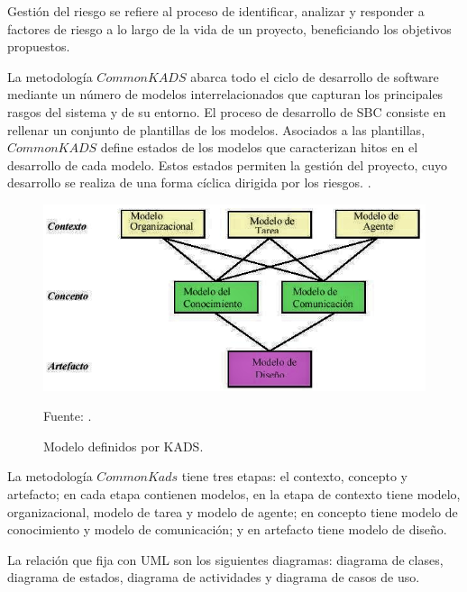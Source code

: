 Gestión del riesgo se refiere al proceso de identificar, analizar y responder a factores de riesgo a lo largo de la vida de un proyecto, beneficiando los objetivos propuestos.

La metodología $Common KADS$ abarca todo el ciclo de desarrollo de software mediante un número de modelos interrelacionados que capturan los principales rasgos del sistema y de su entorno.
El proceso de desarrollo de SBC consiste en rellenar un conjunto de plantillas de los modelos. Asociados a las plantillas, $Common KADS$ define estados de los modelos que caracterizan hitos en el desarrollo de cada modelo. Estos estados permiten la gestión del proyecto, cuyo desarrollo se realiza de una forma cíclica dirigida por los riesgos. \citep{lagos2002commonkads}.

\begin{figure}[h!]
	\centering
		\includegraphics[scale=0.7]{imagenes/ModelosKaps.png}
		
		\caption{Modelo definidos por KADS.}
		Fuente: \cite{lagos2002commonkads}.

	\label{fig:ModelosKaps}
\end{figure}
La metodología $Common Kads$ tiene tres etapas: el contexto, concepto y artefacto; en cada etapa contienen modelos, en la etapa de contexto tiene modelo, organizacional, modelo de tarea y modelo de agente; en concepto tiene modelo de conocimiento y modelo de comunicación; y en artefacto tiene modelo de diseño.

La relación que fija con UML son los siguientes diagramas: diagrama de clases, diagrama de estados, diagrama de actividades y diagrama de casos de uso. \citep{lagos2002commonkads}\\

